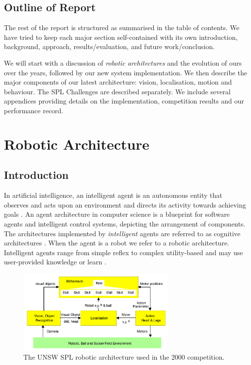 \documentclass[pdftex,11pt,a4paper]{report}
\begin{document}
\section{Outline of Report}  
The rest of the report is structured as summarised in the table of contents. We have tried to keep each major section self-contained with its own introduction, background, approach, results/evaluation, and future work/conclusion.

We will start with a discussion of \emph{robotic architectures} and the evolution of ours over the years, followed by our new system implementation. We then describe the major components of our latest architecture: vision, localisation, motion and behaviour. The SPL Challenges are described separately. We include several appendices providing details on the implementation, competition results and our performance record.  

\newpage
\chapter{Robotic Architecture}
\section{Introduction}

In artificial intelligence, an intelligent agent is an autonomous entity that observes and acts upon an environment and directs its activity towards achieving goals \cite{russell95artificial}. An agent architecture in computer science is a blueprint for software agents and intelligent control systems, depicting the arrangement of components. The architectures implemented by \emph{intelligent} agents are referred to as cognitive architectures \cite{andronache04integrating}. When the agent is a robot we refer to a robotic architecture. Intelligent agents range from simple reflex to complex utility-based and may use user-provided knowledge or learn \cite{russell95artificial}. 

\begin{figure}[ht]
\centering
\includegraphics[width=0.7\textwidth]{figures/RoboticArchitecture2000}
\caption{The UNSW SPL robotic architecture used in the 2000 competition.} \label{figRoboticArchitecture2000}
\end{figure}
\end{document}
